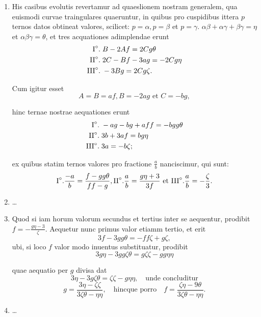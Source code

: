 \documentclass[10pt,a4paper]{article}
\newcommand{\switchenum}{\setcounter{enumi}{\arabic{enumi}-1}\switchcolumn}
\begin{document}
\begin{paracol}{2}
\begin{enumerate}[topsep=1px]
		\item His casibus evolutis revertamur ad quaeslionem nostram generalem, qua euismodi curvae traingulares quaeruntur, in quibus pro cuspidibus ittera $p$ ternos datos obtineat valores, scilicet: $p=\alpha, p=\beta$ et $p=\gamma$. $\alpha\beta + \alpha \gamma + \beta \gamma = \eta$ et $\alpha \beta \gamma = \theta$, et tres acquationes adimplendae erunt
		\begin{align*}
			\text{I}\degree. \;&B -2Af = 2Cg\theta\\
			\text{II}\degree. \;& 2C-Bf-3ag = -2Cg\eta\\
			\text{III}\degree. \;& -3Bg = 2Cg\zeta.
		\end{align*}
		\par Cum igitur esset
		\[
			A=B=af, B=-2ag \text{ et } C= -bg,
		\]
		\par hinc ternae nostrae aequationes erunt
		\begin{align*}
			\text{I}\degree. \;& -ag -bg+aff = -bgg\theta\\
			\text{II}\degree. \;& 3b +3af = bg\eta\\
			\text{III}\degree. \;& 3a=-b\zeta;		
		\end{align*}
		\par ex quibus statim ternos valores pro fractione $\frac{a}{b}$ nanciscimur, qui sunt:
		\[
			\text{I}\degree. \frac{-a}{b} = \frac{f-gg\theta}{ff-g}, \text{II}\degree. \frac{a}{b} = \frac{g\eta + 3}{3f} \text{ et } \text{III}\degree. \frac{a}{b} = -\frac{\zeta}{3}.
		\]
		
		\switchenum
		\item \ldots
		\switchcolumn*
		
		\item Quod si iam horum valorum secundus et tertius inter se aequentur, prodibit $f=-\frac{g\eta -3 }{\zeta}$. Aequetur nunc primus valor etiamm tertio, et erit
		\[
			3f-3gg\theta = -ff \zeta + g \zeta,
		\]
		ubi, si loco $f$ valor modo inuentus substituatur, prodibit
		\[
			3g\eta -3gg\zeta \theta = g\zeta \zeta - gg\eta \eta
		\]
		\par quae aequatio per $g$ divisa dat
		\[
			3\eta - 3g\zeta \theta = \zeta \zeta - g\eta \eta, \quad \text{unde concluditur}
		\]
		\[
			g= \frac{3\eta - \zeta \zeta}{3\zeta \theta - \eta \eta}, \quad \text{hincque porro} \quad f = \frac{\zeta \eta - 9\theta}{3\zeta \theta - \eta \eta}.
		\]
		
		\switchenum
		\item \ldots
		\switchcolumn*
		

\end{enumerate}
\end{paracol}
\end{document}
